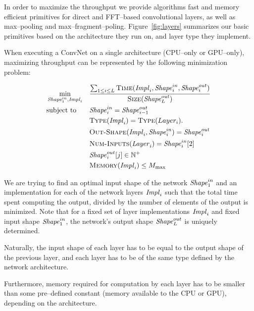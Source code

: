 \documentclass[conference]{IEEEtran}
\begin{document}
  In order to maximize the throughput we provide algorithms fast and
  memory efficient primitives for direct and FFT--based convolutional
  layers, as well as max--pooling and max--fragment--poling.
  Figure~\ref{fig:layers} summarizes our basic primitives based on the
  architecture they run on, and layer type they implement.

  When executing a ConvNet on a single architecture (CPU--only or
  GPU--only), maximizing throughput can be represented by the
  following minimization problem:

  \begin{equation*}
    \begin{aligned}
      & \min_{\id{Shape}^{in}_1, \id{Impl}_i}
      & & \frac{\sum_{1 \le i \le L} \proc{Time}(\id{Impl}_i,\id{Shape}^{in}_i,\id{Shape}^{out}_i)}
      { \proc{Size}( \id{Shape}^{out}_L)} \\
      & \textrm{subject to} & &
      \id{Shape}^{in}_i = \id{Shape}^{out}_{i-1} \\
      & & &
      \proc{Type}(\id{Impl}_i) = \proc{Type}(Layer_i). \\
      & & &
      \proc{Out-Shape}(\id{Impl}_i,\id{Shape}^{in}_i) = \id{Shape}^{out}_i \\
      & & &
      \proc{Num-Inputs}(\id{Layer}_i) = \id{Shape}^{in}_i[2] \\
      & & &
      \id{Shape}^{out}_i[j] \in \mathbb{N}^+ \\
      & & &
      \proc{Memory}(\id{Impl}_i) \le M_{\max} \\
    \end{aligned}
  \end{equation*}

  We are trying to find an optimal input shape of the network
  $\id{Shape}^{in}_1$ and an implementation for each of the network
  layers $\id{Impl}_i$ such that the total time spent computing the
  output, divided by the number of elements of the output is
  minimized.  Note that for a fixed set of layer implementations
  $\id{Impl}_i$ and fixed input shape $\id{Shape}^{in}_1$, the
  network's output shape $\id{Shape}^{out}_L$ is uniquely determined.

  Naturally, the input shape of each layer has to be equal to the
  output shape of the previous layer, and each layer has to be of the
  same type defined by the network architecture.

  Furthermore, memory required for computation by each layer has to be
  smaller than some pre--defined constant (memory available to the CPU
  or GPU), depending on the architecture.
\end{document}
